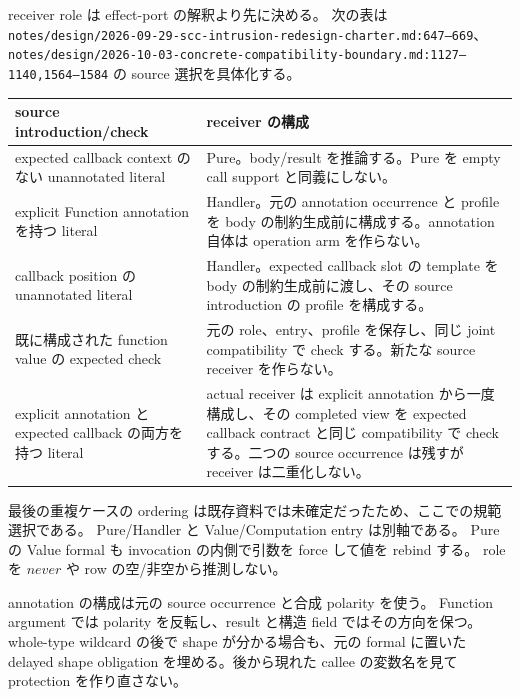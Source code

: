 \documentclass[11pt,a4paper]{article}
\theoremstyle{remark}
\begin{document}
receiver role は effect-port の解釈より先に決める。
次の表は \texttt{notes/design/2026-09-29-scc-intrusion-redesign-charter.md:647--669}、
\texttt{notes/design/2026-10-03-concrete-compatibility-boundary.md:1127--1140,1564--1584}
の source 選択を具体化する。
\begin{longtable}{p{}p{}}
\toprule
source introduction/check & receiver の構成 \\
\midrule\endhead
expected callback context のない unannotated literal & Pure。body/result を推論する。Pure を empty call support と同義にしない。\\
explicit Function annotation を持つ literal & Handler。元の annotation occurrence と profile を body の制約生成前に構成する。annotation 自体は operation arm を作らない。\\
callback position の unannotated literal & Handler。expected callback slot の template を body の制約生成前に渡し、その source introduction の profile を構成する。\\
既に構成された function value の expected check & 元の role、entry、profile を保存し、同じ joint compatibility で check する。新たな source receiver を作らない。\\
explicit annotation と expected callback の両方を持つ literal & actual receiver は explicit annotation から一度構成し、その completed view を expected callback contract と同じ compatibility で check する。二つの source occurrence は残すが receiver は二重化しない。\\
\bottomrule
\end{longtable}
最後の重複ケースの ordering は既存資料では未確定だったため、ここでの規範選択である。
Pure/Handler と Value/Computation entry は別軸である。
Pure の Value formal も invocation の内側で引数を force して値を rebind する。
role を $never$ や row の空/非空から推測しない。

annotation の構成は元の source occurrence と合成 polarity を使う。
Function argument では polarity を反転し、result と構造 field ではその方向を保つ。
whole-type wildcard の後で shape が分かる場合も、元の formal に置いた delayed shape obligation
を埋める。後から現れた callee の変数名を見て protection を作り直さない。
\end{document}
